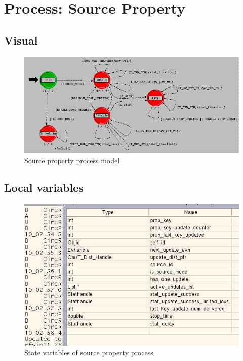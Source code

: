 
\section{Process: Source Property}

\subsection{Visual}
\begin{figure}[ht]
    \centering
    \includegraphics[width=.7\textwidth]{images/p_source_property}
    \caption{Source property process model}
    \label{fig:appendix-a}
\end{figure}

\subsection{Local variables}
\begin{figure}[ht]
    \centering
    \includegraphics[width=.7\textwidth]{images/state_variable_source_property}
    \caption{State variables of source property process}
    \label{fig:appendix-a_sv}
\end{figure}

